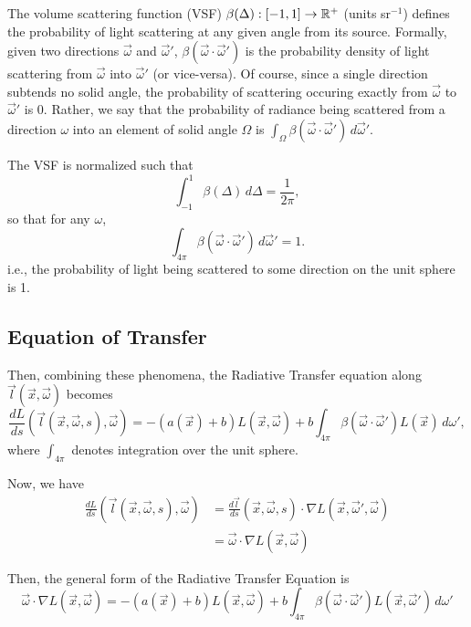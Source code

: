 The volume scattering function (VSF) $\beta(\Delta): [-1, 1] \to \mathbb{R}^+$ (units sr$^{-1}$) defines the probability of light scattering at any given angle from its source.
Formally, given two directions $\vec{\omega}$ and $\vec{\omega}'$, $\beta(\vec{\omega} \cdot \vec{\omega}')$ is the probability density of light scattering from $\vec{\omega}$ into $\vec{\omega}'$ (or vice-versa).
Of course, since a single direction subtends no solid angle, the probability of scattering occuring exactly from $\vec{\omega}$ to $\vec{\omega}'$ is 0.
Rather, we say that the probability of radiance being scattered from a direction $\omega$ into an element of solid angle $\Omega$ is $\int_\Omega \beta(\vec{\omega} \cdot \vec{\omega}')\, d\vec{\omega}'$.

The VSF is normalized such that
\begin{equation}
  \int_{-1}^1\beta(\Delta)\, d\Delta=\frac{1}{2\pi},
\end{equation}
so that for any $\omega$,
\begin{equation}
  \int_{4\pi}\beta(\vec{\omega}\cdot\vec{\omega}')\, d\vec{\omega}' = 1.
\end{equation}
i.e., the probability of light being scattered to some direction on the unit sphere is 1.

\subsection{Equation of Transfer}
Then, combining these phenomena, the Radiative Transfer equation along
$\vec{l}(\vec{x}, \vec{\omega})$ becomes
\begin{equation}
  \label{eqn:rte1d}
  \frac{dL}{ds}(\vec{l}(\vec{x}, \vec{\omega}, s), \vec{\omega})
  = -(a(\vec{x}) + b)L(\vec{x}, \vec{\omega})
  + b \int_{4\pi} \beta(\vec{\omega}\cdot\vec{\omega}') L(\vec{x})\, d\omega',
\end{equation}
where $\int_{4\pi}$ denotes integration over the unit sphere.

Now, we have
\begin{align*}
  \frac{dL}{ds}(\vec{l}(\vec{x}, \vec{\omega}, s), \vec{\omega})
    &= \frac{d\vec{l}}{ds}(\vec{x}, \vec{\omega}, s) \cdot \nabla L(\vec{x}, \vec{\omega}', \vec{\omega}) \\
    &= \vec{\omega} \cdot \nabla L(\vec{x}, \vec{\omega})
\end{align*}

Then, the general form of the Radiative Transfer Equation is
\begin{equation}
  \vec{\omega} \cdot \nabla L(\vec{x}, \vec{\omega})
  = -(a(\vec{x}) + b)L(\vec{x}, \vec{\omega})
  + b \int_{4\pi} \beta(\vec{\omega}\cdot\vec{\omega}') L(\vec{x}, \vec{\omega}')\, d\omega'
\end{equation}

